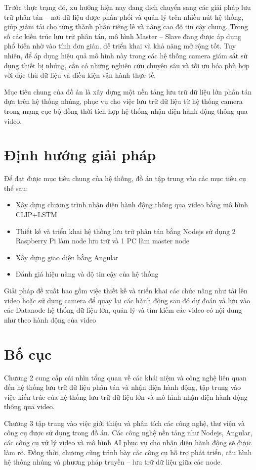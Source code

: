 \documentclass[../main.tex]{subfiles}
\begin{document}
Trước thực trạng đó, xu hướng hiện nay đang dịch chuyển sang các giải pháp lưu trữ phân tán – nơi dữ liệu được phân phối và quản lý trên nhiều nút hệ thống, giúp giảm tải cho từng thành phần riêng lẻ và nâng cao độ tin cậy chung. Trong số các kiến trúc lưu trữ phân tán, mô hình Master – Slave đang được áp dụng phổ biến nhờ vào tính đơn giản, dễ triển khai và khả năng mở rộng tốt. Tuy nhiên, để áp dụng hiệu quả mô hình này trong các hệ thống camera giám sát sử dụng thiết bị nhúng, cần có những nghiên cứu chuyên sâu và tối ưu hóa phù hợp với đặc thù dữ liệu và điều kiện vận hành thực tế.

Mục tiêu chung của đồ án là xây dựng một nền tảng lưu trữ dữ liệu lớn phân tán dựa trên hệ thống nhúng, phục vụ cho việc lưu trữ dữ liệu từ hệ thống camera trong mạng cục bộ đồng thời tích hợp hệ thống nhận diện hành động thông qua video.

\section{Định hướng giải pháp}
Để đạt được mục tiêu chung của hệ thống, đồ án tập trung vào các mục tiêu cụ thể sau:

\begin{itemize}
   \item Xây dựng chương trình nhận diện hành động thông qua video bằng mô hình CLIP+LSTM
   \item Thiết kế và triển khai hệ thống lưu trữ phân tán bằng Nodejs sử dụng 2 Raspberry Pi làm node lưu trữ và 1 PC làm master node
   \item Xây dựng giao diện bằng Angular
   \item Đánh giá hiệu năng và độ tin cậy của hệ thống
\end{itemize}
Giải pháp đề xuất bao gồm việc thiết kế và triển khai các chức năng như tải lên video hoặc sử dụng camera để quay lại các hành động sau đó dự đoán và lưu vào các Datanode hệ thống dữ liệu lớn, quản lý và tìm kiếm các video có nội dung như theo hành động của video
\section{Bố cục}
Chương 2 cung cấp cái nhìn tổng quan về các khái niệm và công nghệ liên quan đến hệ thống lưu trữ dữ liệu phân tán và nhận diện hành động, tập trung vào việc kiến trúc của hệ thống lưu trữ dữ liệu lớn và mô hình nhận diện hành động thông qua video.

Chương 3 tập trung vào việc giới thiệu và phân tích các công nghệ, thư viện và công cụ được sử dụng trong đồ án. Các công nghệ nền tảng như Nodejs, Angular, các công cụ xử lý video và mô hình AI phục vụ cho nhận diện hành động sẽ được làm rõ. Đồng thời, chương cũng trình bày các công cụ hỗ trợ phát triển, cấu hình hệ thống nhúng và phương pháp truyền – lưu trữ dữ liệu giữa các node.
\end{document}
